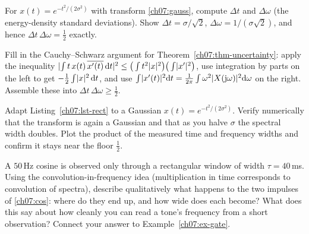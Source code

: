 \begin{exercise}
\label{ch07:ex-gauss}
For $x(t)=e^{-t^2/(2\sigma^2)}$ with transform \eqref{ch07:gauss}, compute $\Delta t$ and
$\Delta\omega$ (the energy-density standard deviations). Show $\Delta t = \sigma/\sqrt2$,
$\Delta\omega = 1/(\sigma\sqrt2)$, and hence $\Delta t\,\Delta\omega = \tfrac12$ exactly.
\end{exercise}

\begin{exercise}
\label{ch07:ex-uncertainty}
Fill in the Cauchy--Schwarz argument for Theorem~\ref{ch07:thm-uncertainty}: apply the
inequality $\lvert\int t\,x(t)\,\overline{x'(t)}\,\mathrm{d} t\rvert^2 \le \big(\int t^2\lvert x\rvert^2\big)\big(\int\lvert x'\rvert^2\big)$,
use integration by parts on the left to get $-\tfrac12\int\lvert x\rvert^2\,\mathrm{d} t$, and use
$\int\lvert x'(t)\rvert^2\mathrm{d} t = \frac{1}{2\pi}\int\omega^2\lvert X(\mathrm{j}\omega)\rvert^2\mathrm{d}\omega$ on the
right. Assemble these into $\Delta t\,\Delta\omega\ge\tfrac12$.
\end{exercise}

\begin{exercise}
\label{ch07:ex-numeric}
Adapt Listing~\ref{ch07:lst-rect} to a Gaussian $x(t)=e^{-t^2/(2\sigma^2)}$. Verify
numerically that the transform is again a Gaussian and that as you halve $\sigma$ the
spectral width doubles. Plot the product of the measured time and frequency widths and
confirm it stays near the floor $\tfrac12$.
\end{exercise}

\begin{exercise}
\label{ch07:ex-gate2}
A $50\,$Hz cosine is observed only through a rectangular window of width $\tau=40\,$ms.
Using the convolution-in-frequency idea (multiplication in time corresponds to
convolution of spectra), describe qualitatively what happens to the two impulses of
\eqref{ch07:cos}: where do they end up, and how wide does each become? What does this say
about how cleanly you can read a tone's frequency from a short observation? Connect your
answer to Example~\ref{ch07:ex-gate}.
\end{exercise}
